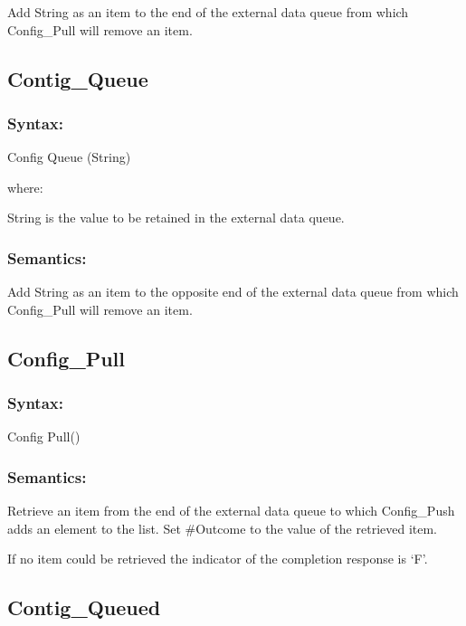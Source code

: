 Add String as an item to the end of the external data queue from which
Config\_Pull will remove an item.

\subsection{Contig\_Queue}\label{contig_queue}

\subsubsection{Syntax:}\label{syntax-20}

Config Queue (String)

where:

String is the value to be retained in the external data queue.

\subsubsection{Semantics:}\label{semantics-21}

Add String as an item to the opposite end of the external data queue
from which Config\_Pull will remove an item.

\subsection{Config\_Pull}\label{config_pull}

\subsubsection{Syntax:}\label{syntax-21}

Config Pull()

\subsubsection{Semantics:}\label{semantics-22}

Retrieve an item from the end of the external data queue to which
Config\_Push adds an element to the list. Set \#Outcome to the value of
the retrieved item.

If no item could be retrieved the indicator of the completion response
is `F'.

\subsection{Contig\_Queued}\label{contig_queued}

